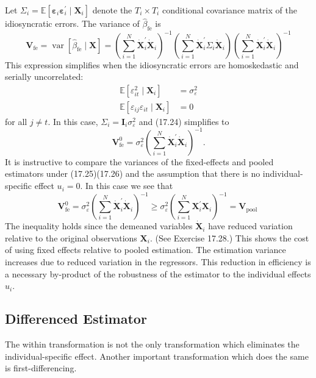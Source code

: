 \documentclass[10pt]{article}
\begin{document}
Let $\Sigma_{i}=\mathbb{E}\left[\boldsymbol{\varepsilon}_{i} \boldsymbol{\varepsilon}_{i}^{\prime} \mid \boldsymbol{X}_{i}\right]$ denote the $T_{i} \times T_{i}$ conditional covariance matrix of the idiosyncratic errors. The variance of $\widehat{\beta}_{\mathrm{fe}}$ is
$$
\boldsymbol{V}_{\mathrm{fe}}=\operatorname{var}\left[\widehat{\beta}_{\mathrm{fe}} \mid \boldsymbol{X}\right]=\left(\sum_{i=1}^{N} \dot{\boldsymbol{X}}_{i}^{\prime} \dot{\boldsymbol{X}}_{i}\right)^{-1}\left(\sum_{i=1}^{N} \dot{\boldsymbol{X}}_{i}^{\prime} \Sigma_{i} \dot{\boldsymbol{X}}_{i}\right)\left(\sum_{i=1}^{N} \dot{\boldsymbol{X}}_{i}^{\prime} \dot{\boldsymbol{X}}_{i}\right)^{-1}
$$
This expression simplifies when the idiosyncratic errors are homoskedastic and serially uncorrelated:
$$
\begin{aligned}
\mathbb{E}\left[\varepsilon_{i t}^{2} \mid \boldsymbol{X}_{i}\right] &=\sigma_{\varepsilon}^{2} \\
\mathbb{E}\left[\varepsilon_{i j} \varepsilon_{i t} \mid \boldsymbol{X}_{i}\right] &=0
\end{aligned}
$$
for all $j \neq t$. In this case, $\Sigma_{i}=\boldsymbol{I}_{i} \sigma_{\varepsilon}^{2}$ and (17.24) simplifies to
$$
\boldsymbol{V}_{\mathrm{fe}}^{0}=\sigma_{\varepsilon}^{2}\left(\sum_{i=1}^{N} \dot{\boldsymbol{X}}_{i}^{\prime} \dot{\boldsymbol{X}}_{i}\right)^{-1} .
$$
It is instructive to compare the variances of the fixed-effects and pooled estimators under (17.25)(17.26) and the assumption that there is no individual-specific effect $u_{i}=0$. In this case we see that
$$
\boldsymbol{V}_{\mathrm{fe}}^{0}=\sigma_{\varepsilon}^{2}\left(\sum_{i=1}^{N} \dot{\boldsymbol{X}}_{i}^{\prime} \dot{\boldsymbol{X}}_{i}\right)^{-1} \geq \sigma_{\varepsilon}^{2}\left(\sum_{i=1}^{N} \boldsymbol{X}_{i}^{\prime} \boldsymbol{X}_{i}\right)^{-1}=\boldsymbol{V}_{\text {pool }}
$$
The inequality holds since the demeaned variables $\dot{\boldsymbol{X}}_{i}$ have reduced variation relative to the original observations $\boldsymbol{X}_{i}$. (See Exercise 17.28.) This shows the cost of using fixed effects relative to pooled estimation. The estimation variance increases due to reduced variation in the regressors. This reduction in efficiency is a necessary by-product of the robustness of the estimator to the individual effects $u_{i}$.

\subsection{Differenced Estimator}
The within transformation is not the only transformation which eliminates the individual-specific effect. Another important transformation which does the same is first-differencing.
\end{document}
